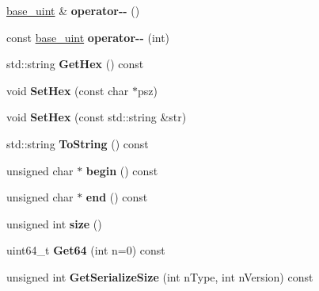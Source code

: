 \begin{DoxyCompactItemize}
\item 
\mbox{\label{classbase__uint_a2cc581d32afac619acd12601ddea4180}} 
\mbox{\hyperlink{classbase__uint}{base\+\_\+uint}} \& {\bfseries operator-\/-\/} ()
\item 
\mbox{\label{classbase__uint_a78a8e46c434c0e61be86282fe9543587}} 
const \mbox{\hyperlink{classbase__uint}{base\+\_\+uint}} {\bfseries operator-\/-\/} (int)
\item 
\mbox{\label{classbase__uint_ae5e7b7481de91ebead20eebd5d685441}} 
std\+::string {\bfseries Get\+Hex} () const
\item 
\mbox{\label{classbase__uint_ade1a897fac931f28f54998c92c797228}} 
void {\bfseries Set\+Hex} (const char $\ast$psz)
\item 
\mbox{\label{classbase__uint_afe3600e6ae4e9f69e1c036581a2716c8}} 
void {\bfseries Set\+Hex} (const std\+::string \&str)
\item 
\mbox{\label{classbase__uint_acccba4d9d51a0c36261718ca0cbb293b}} 
std\+::string {\bfseries To\+String} () const
\item 
\mbox{\label{classbase__uint_ae2dc04d45529b7071718f84955e567b0}} 
unsigned char $\ast$ {\bfseries begin} () const
\item 
\mbox{\label{classbase__uint_a93b7f3e66e7ca7046a4ec9607c7e5e02}} 
unsigned char $\ast$ {\bfseries end} () const
\item 
\mbox{\label{classbase__uint_a5ae90539f45b9d6dde13e0db39020754}} 
unsigned int {\bfseries size} ()
\item 
\mbox{\label{classbase__uint_aae5336be1799bd2debf74efb1d2cc542}} 
uint64\+\_\+t {\bfseries Get64} (int n=0) const
\item 
\mbox{\label{classbase__uint_aa1830b40b57801f1e489adbf4c55ebd9}} 
unsigned int {\bfseries Get\+Serialize\+Size} (int n\+Type, int n\+Version) const
\item 

\end{DoxyCompactItemize}
